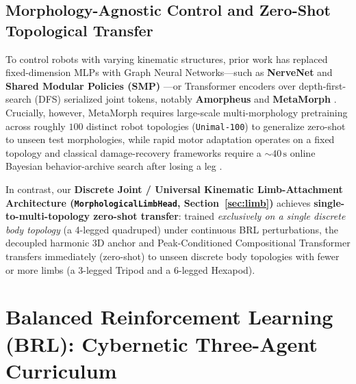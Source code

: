 \documentclass[11pt,a4paper]{article}
\begin{document}
\subsection{Morphology-Agnostic Control and Zero-Shot Topological Transfer}
To control robots with varying kinematic structures, prior work has replaced fixed-dimension MLPs with Graph Neural Networks—such as \textbf{NerveNet} \cite{wang2018nervenet} and \textbf{Shared Modular Policies (SMP)} \cite{huang2020one}—or Transformer encoders over depth-first-search (DFS) serialized joint tokens, notably \textbf{Amorpheus} \cite{kurin2021my} and \textbf{MetaMorph} \cite{gupta2022metamorph}. Crucially, however, MetaMorph requires large-scale multi-morphology pretraining across roughly $100$ distinct robot topologies (\texttt{Unimal-100}) to generalize zero-shot to unseen test morphologies, while rapid motor adaptation \cite{kumar2021rma} operates on a fixed topology and classical damage-recovery frameworks require a $\sim 40\,\text{s}$ online Bayesian behavior-archive search after losing a leg \cite{cully2015robots}.

In contrast, our \textbf{Discrete Joint / Universal Kinematic Limb-Attachment Architecture (\texttt{MorphologicalLimbHead}, Section~\ref{sec:limb})} achieves \textbf{single-to-multi-topology zero-shot transfer}: trained \emph{exclusively on a single discrete body topology} (a 4-legged quadruped) under continuous BRL perturbations, the decoupled harmonic 3D anchor and Peak-Conditioned Compositional Transformer transfers immediately (zero-shot) to unseen discrete body topologies with fewer or more limbs (a 3-legged Tripod and a 6-legged Hexapod).

\section{Balanced Reinforcement Learning (BRL): Cybernetic Three-Agent Curriculum}
\label{sec:brl}
\end{document}
